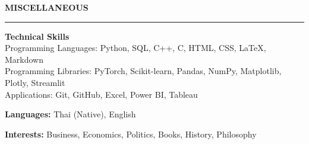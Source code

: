 \documentclass[a4paper, 11pt]{article}
\begin{document}




\vspace{6pt}
\textbf{MISCELLANEOUS}
\vspace{5pt}
{\color{NavyBlue}\hrule}
\vspace{6pt}

\textbf{Technical Skills}\\
\hspace*{7pt} Programming Languages: Python, SQL, C++, C, HTML, CSS, LaTeX, Markdown\\
\hspace*{7pt} Programming Libraries: PyTorch, Scikit-learn, Pandas, NumPy, Matplotlib, Plotly, Streamlit\\
\hspace*{7pt} Applications: Git, GitHub, Excel, Power BI, Tableau

\textbf{Languages:} Thai (Native), English

\textbf{Interests:} Business, Economics, Politics, Books, History, Philosophy
\end{document}
